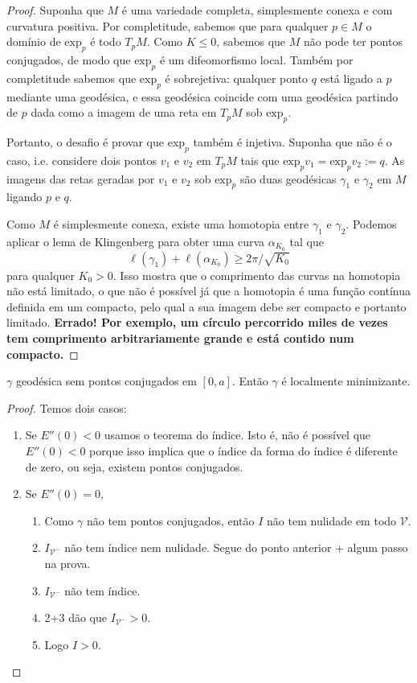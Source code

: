 \begin{proof}
Suponha que $M$ é uma variedade completa, simplesmente conexa e com curvatura
positiva. Por completitude, sabemos que para qualquer $p \in M$ o domínio de
$\text{exp}_p$ é todo $T_pM$. Como $K\leq 0$, sabemos que $M$
não pode ter pontos conjugados, de modo que $\text{exp}_p$ é um
difeomorfismo local. Também por completitude sabemos que
$\text{exp}_p$ é sobrejetiva: qualquer ponto $q$ está ligado a $p$
mediante uma geodésica, e essa geodésica coincide com uma geodésica partindo de
$p$ dada como a imagem de uma reta em $T_pM$ sob $\text{exp}_p$.

Portanto, o desafio é provar que $\text{exp}_p$ também é injetiva.
Suponha que não é o caso, i.e. considere dois pontos $v_1$ e $v_2$ em
$T_pM$ tais que $\text{exp}_pv_1=\text{exp}_pv_2:=q$. As
imagens das retas geradas por $v_1$ e $v_2$ sob $\text{exp}_p$ são
duas geodésicas $\gamma_1$ e $\gamma_2$ em $M$ ligando $p$ e $q$.

Como $M$ é simplesmente conexa, existe uma homotopia entre $\gamma_1$ e
$\gamma_2$. Podemos aplicar o lema de Klingenberg para obter uma curva
$\alpha_{K_0}$ tal que $$ \ell(\gamma_1)+\ell(\alpha_{K_0}) \geq
2\pi/\sqrt{K_0} $$ para qualquer $K_0>0$. Isso mostra que o comprimento das
curvas na homotopia não está limitado, o que não é possível já que a homotopia é
uma função contínua definida em um compacto, pelo qual a sua imagem debe ser
compacto e portanto limitado. {\bf Errado! Por exemplo, um círculo percorrido
miles de vezes tem comprimento arbitrariamente grande e está contido num
compacto.}
\end{proof}

\begin{exercise}
\label{exercise-geodesica-sem-pontos-conjugados-e-localmente-minimizante}
$\gamma$ geodésica sem pontos conjugados em $[0,a]$. Então $\gamma$ é localmente
minimizante.
\end{exercise}

\begin{proof}
Temos dois casos:
\begin{enumerate}
\item Se $E''(0)<0$ usamos o teorema do índice. Isto é, não é possível que
 $E''(0)<0$ porque isso implica que o índice da forma do índice é diferente
 de zero, ou seja, existem pontos conjugados.
\item Se $E''(0)=0$,
\begin{enumerate}
\item[(0)] Como $\gamma$ não tem pontos conjugados, então $I$ não tem
nulidade em todo  $\mathcal{V}$.
\item $I_{\mathcal{V}^-}$ não tem índice nem nulidade. Segue do ponto anterior + 
algum passo na prova.
\item $I_{\mathcal{V}^-}$ não tem índice.
\item 2+3 dão que $I_{\mathcal{V}^-}>0$.
\item Logo $I>0$.
\end{enumerate}
\end{enumerate}
\end{proof}

